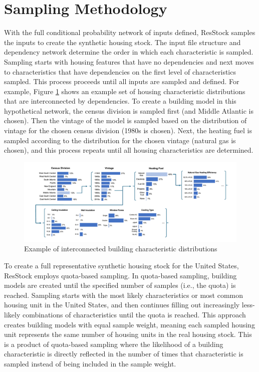 \section{Sampling Methodology} \label{sec:sampling_methodology}
 With the full conditional probability network of inputs defined, ResStock samples the inputs to create the synthetic housing stock. The input file structure and dependency network determine the order in which each characteristic is sampled. Sampling starts with housing features that have no dependencies and next moves to characteristics that have dependencies on the first level of characteristics sampled. This process proceeds until all inputs are sampled and defined. For example, Figure \ref{fig:ex_build_char_distrs} shows an example set of housing characteristic distributions that are interconnected by dependencies. To create a building model in this hypothetical network, the census division is sampled first (and Middle Atlantic is chosen). Then the vintage of the model is sampled based on the distribution of vintage for the chosen census division (1980s is chosen). Next, the heating fuel is sampled according to the distribution for the chosen vintage (natural gas is chosen), and this process repeats until all housing characteristics are determined.  

\begin{figure}
    \centering
    \includegraphics[width=1\linewidth]{images/Figure 4.pdf}
    \caption{Example of interconnected building characteristic distributions}
    \label{fig:ex_build_char_distrs}
\end{figure}

To create a full representative synthetic housing stock for the United States, ResStock employs quota-based sampling. In quota-based sampling, building models are created until the specified number of samples (i.e., the quota) is reached. Sampling starts with the most likely characteristics or most common housing unit in the United States, and then continues filling out increasingly less-likely combinations of characteristics until the quota is reached. This approach creates building models with equal sample weight, meaning each sampled housing unit represents the same number of housing units in the real housing stock. This is a product of quota-based sampling where the likelihood of a building characteristic is directly reflected in the number of times that characteristic is sampled instead of being included in the sample weight.

